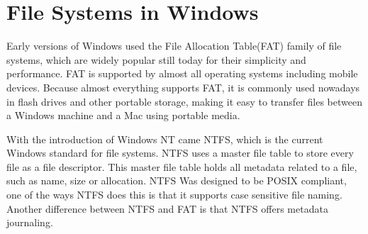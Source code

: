 \documentclass[10pt,serif,draftclsnofoot,onecolumn]{IEEEtran}
\begin{document}
	\section{File Systems in Windows}
	\par
			Early versions of Windows used the File Allocation Table(FAT) family of file systems, which are widely popular still today for their simplicity and performance\cite{5}. FAT is supported by almost all operating systems including mobile devices. Because almost everything supports FAT, it is commonly used nowadays in flash drives and other portable storage, making it easy to transfer files between a Windows machine and a Mac using portable media. 
	\newline
	\par
			With the introduction of Windows NT came NTFS, which is the current Windows standard for file systems\cite{5}. NTFS uses a master file table to store every file as a file descriptor. This master file table holds all metadata related to a file, such as name, size or allocation\cite{5}. NTFS Was designed to be POSIX compliant, one of the ways NTFS does this is that it supports case sensitive file naming\cite{6}. Another difference between NTFS and FAT is that NTFS offers metadata journaling.
	\newline
\end{document}

